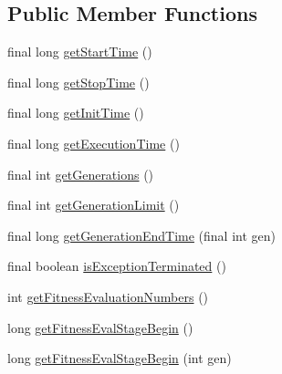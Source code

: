 \subsection*{Public Member Functions}
\begin{DoxyCompactItemize}
\item 
final long \hyperlink{classjenes_1_1_genetic_algorithm_3_01_t_01extends_01_chromosome_01_4_1_1_statistics_a9868aa17a05187be467906036cf52149}{get\-Start\-Time} ()
\item 
final long \hyperlink{classjenes_1_1_genetic_algorithm_3_01_t_01extends_01_chromosome_01_4_1_1_statistics_a71995922cff64ead804adec8f192df01}{get\-Stop\-Time} ()
\item 
final long \hyperlink{classjenes_1_1_genetic_algorithm_3_01_t_01extends_01_chromosome_01_4_1_1_statistics_aa2032a65f77defd0ef1cf7dad4223d39}{get\-Init\-Time} ()
\item 
final long \hyperlink{classjenes_1_1_genetic_algorithm_3_01_t_01extends_01_chromosome_01_4_1_1_statistics_a51a2a1a719226a70c4e8966c92024b5d}{get\-Execution\-Time} ()
\item 
final int \hyperlink{classjenes_1_1_genetic_algorithm_3_01_t_01extends_01_chromosome_01_4_1_1_statistics_a42c08b0214f6fb73743a282c92ae7988}{get\-Generations} ()
\item 
final int \hyperlink{classjenes_1_1_genetic_algorithm_3_01_t_01extends_01_chromosome_01_4_1_1_statistics_a8602c59eb51fb35db57b28ce5c03ad16}{get\-Generation\-Limit} ()
\item 
final long \hyperlink{classjenes_1_1_genetic_algorithm_3_01_t_01extends_01_chromosome_01_4_1_1_statistics_a258851d6957532a6ed355e25d98e6bcd}{get\-Generation\-End\-Time} (final int gen)
\item 
final boolean \hyperlink{classjenes_1_1_genetic_algorithm_3_01_t_01extends_01_chromosome_01_4_1_1_statistics_a12b18f1b160a57bf2d32cbad3e38a39a}{is\-Exception\-Terminated} ()
\item 
int \hyperlink{classjenes_1_1_genetic_algorithm_3_01_t_01extends_01_chromosome_01_4_1_1_statistics_abe0f3443673377de2254946c476fae1b}{get\-Fitness\-Evaluation\-Numbers} ()
\item 
long \hyperlink{classjenes_1_1_genetic_algorithm_3_01_t_01extends_01_chromosome_01_4_1_1_statistics_a133f3fec812000aba8b0dd3e883c979d}{get\-Fitness\-Eval\-Stage\-Begin} ()
\item 
long \hyperlink{classjenes_1_1_genetic_algorithm_3_01_t_01extends_01_chromosome_01_4_1_1_statistics_ac8935a30323022b98639c291dda1f47b}{get\-Fitness\-Eval\-Stage\-Begin} (int gen)

\end{DoxyCompactItemize}
